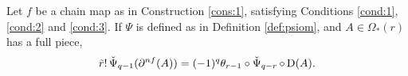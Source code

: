 %

\begin{proposition}\label{prop:condition}
	Let $f$ be a chain map as in Construction \ref{cons:1}, satisfying Conditions \eqref{cond:1}, \eqref{cond:2} and \eqref{cond:3}. If $\Psi$ is defined as in Definition \ref{def:psiom}, and $A\in \Omega_*(r)$ has a full piece,
	\[
	\tilde{r}!\operatorname{\check{\Psi}}_{q-1}(\partial^{nf} (A)) = (-1)^q\theta_{r-1}\circ \operatorname{\check{\Psi}}_{q-r}\circ\operatorname{D}(A).
	\]
\end{proposition}

